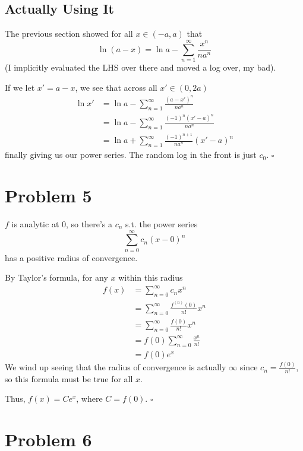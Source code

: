 \documentclass[12pt]{article}
\begin{document}
\subsection{Actually Using It}

The previous section showed for all $x \in (-a, a)$ that
\[\ln(a-x) = \ln a -\sum_{n=1}^{\infty} \frac{x^n}{na^n}\]
(I implicitly evaluated the LHS over there and moved a log over, my bad).

If we let $x'=a-x$, we see that across all $x' \in (0, 2a)$
\begin{align*}
    \ln x'
    &= \ln a - \sum_{n=1}^{\infty} \frac{(a-x')^n}{na^n} \\
    &= \ln a - \sum_{n=1}^{\infty} \frac{(-1)^n(x'-a)^n}{na^n} \\
    &= \ln a + \sum_{n=1}^{\infty} \frac{(-1)^{n+1}}{na^n}(x'-a)^n
\end{align*}
finally giving us our power series.
The random log in the front is just $c_0$. $\square$

\pagebreak

\section{Problem 5}

$f$ is analytic at $0$, so there's a $c_n$ s.t. the power series
\[\sum_{n=0}^{\infty} c_n(x-0)^n\]
has a positive radius of convergence.

By Taylor's formula, for any $x$ within this radius
\begin{align*}
    f(x)
     & = \sum_{n=0}^{\infty} c_n x^n                   \\
     & = \sum_{n=0}^{\infty} \frac{f^{(n)}(0)}{n!} x^n \\
     & = \sum_{n=0}^{\infty} \frac{f(0)}{n!}x^n        \\
     & = f(0) \sum_{n=0}^{\infty} \frac{x^n}{n!}       \\
     & = f(0) e^x
\end{align*}
We wind up seeing that the radius of convergence is actually $\infty$
since $c_n=\frac{f(0)}{n!}$, so this formula must be true for all $x$.

Thus, $f(x)=Ce^x$, where $C=f(0)$. $\square$

\pagebreak

\section{Problem 6}
\end{document}
